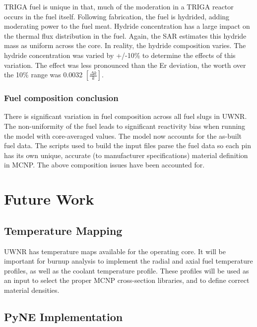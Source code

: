 \documentclass{UWNR_modeling}
\begin{document}
TRIGA fuel is unique in that, much of the moderation in a TRIGA reactor occurs in the fuel itself. Following fabrication, the fuel is hydrided, adding moderating power to the fuel meat. Hydride concentration has a large impact on the thermal flux distribution in the fuel. Again, the SAR estimates this hydride mass as uniform across the core. In reality, the hydride composition varies. The hydride concentration was varied by +/-10\% to determine the effects of this variation. The effect was less pronounced than the Er deviation, the worth over the 10\% range was 0.0032 $[\frac{\Delta k}{k}]$.

\subsubsection{Fuel composition conclusion}

There is significant variation in fuel composition across all fuel slugs in UWNR. The non-uniformity of the fuel leads to significant reactivity bias when running the model with core-averaged values. The model now accounts for the as-built fuel data. The scripts used to build the input files parse the fuel data so each pin has its own unique, accurate (to manufacturer specifications) material definition in MCNP. The above composition issues have been accounted for.
 







\section{Future Work}

\subsection{Temperature Mapping}

UWNR has temperature maps available for the operating core. It will be important for burnup analysis to implement the radial and axial fuel temperature profiles, as well as the coolant temperature profile. These profiles will be used as an input to select the proper MCNP cross-section libraries, and to define correct material densities. 

\subsection{PyNE Implementation}
\end{document}
